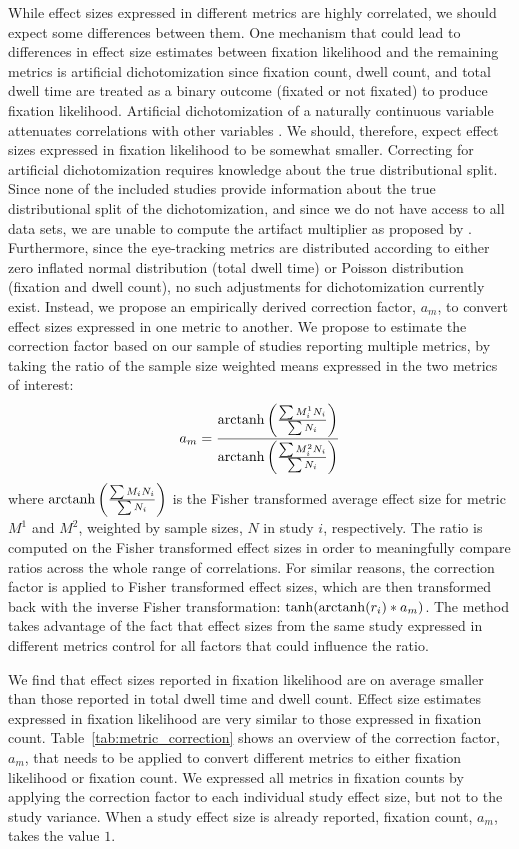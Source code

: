 While effect sizes expressed in different metrics are highly correlated, we should expect some differences between them. One mechanism that could lead to differences in effect size estimates between fixation likelihood and the remaining metrics is artificial dichotomization since fixation count, dwell count, and total dwell time are treated as a binary outcome (fixated or not fixated) to produce fixation likelihood. Artificial dichotomization of a naturally continuous variable attenuates correlations with other variables \citep{hunter2004a}. We should, therefore, expect effect sizes expressed in fixation likelihood to be somewhat smaller. Correcting for artificial dichotomization requires knowledge about the true distributional split. Since none of the included studies provide information about the true distributional split of the dichotomization, and since we do not have access to all data sets, we are unable to compute the artifact multiplier as proposed by \cite{hunter2004a}. Furthermore, since the eye-tracking metrics are distributed according to either zero inflated normal distribution (total dwell time) or Poisson distribution (fixation and dwell count), no such adjustments for dichotomization currently exist. Instead, we propose an empirically derived correction factor, $a_m$, to convert effect sizes expressed in one metric to another. We propose to estimate the correction factor based on our sample of studies reporting multiple metrics, by taking the ratio of the sample size weighted means expressed in the two metrics of interest:
%
\begin{equation}
\label{eq:metrics_correction}
a_m = \frac{\operatorname{arctanh} \left( \frac{\sum M_i^1 N_i}{\sum N_i} \right)}{\operatorname{arctanh} \left( \frac{\sum M_i^2 N_i}{\sum N_i} \right)}
\end{equation}
%
where $\operatorname{arctanh} \left( \frac{\sum M_i N_i}{\sum N_i} \right)$ is the Fisher transformed average effect size for metric $M^1$ and $M^2$, weighted by sample sizes, $N$ in study $i$, respectively. The ratio is computed on the Fisher transformed effect sizes in order to meaningfully compare ratios across the whole range of correlations. For similar reasons, the correction factor is applied to Fisher transformed effect sizes, which are then transformed back with the inverse Fisher transformation: $\tanh(\operatorname{arctanh}(r_i)*a_m)$. The method takes advantage of the fact that effect sizes from the same study expressed in different metrics control for all factors that could influence the ratio.  

We find that effect sizes reported in fixation likelihood are on average smaller than those reported in total dwell time and dwell count. Effect size estimates expressed in fixation likelihood are very similar to those expressed in fixation count. Table~\ref{tab:metric_correction} shows an overview of the correction factor, $a_m$, that needs to be applied to convert different metrics to either fixation likelihood or fixation count. We expressed all metrics in fixation counts by applying the correction factor to each individual study effect size, but not to the study variance. When a study effect size is already reported, fixation count, $a_m$, takes the value $1$.  

